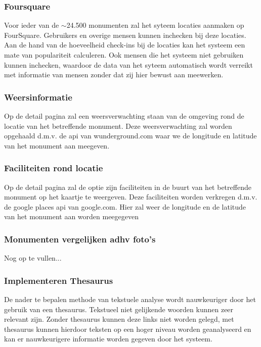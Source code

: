 \documentclass[a4paper,10pt]{article}
\begin{document}
			\subsubsection{Foursquare}
			Voor ieder van de $\sim$24.500 monumenten zal het syteem locaties aanmaken op FourSquare. Gebruikers en overige mensen kunnen inchecken bij deze locaties. Aan de hand van de hoeveelheid check-ins bij de locaties kan het systeem een mate van populariteit calculeren. Ook mensen die het systeem niet gebruiken kunnen inchecken, waardoor de data van het syteem automatisch wordt verreikt met informatie van mensen zonder dat zij hier bewust aan meewerken.
				
			\subsubsection{Weersinformatie}
			Op de detail pagina zal een weersverwachting staan van de omgeving rond de locatie van het betreffende monument. Deze weersverwachting zal worden opgehaald d.m.v. de api van wunderground.com waar we de longitude en latitude van het monument aan meegeven.
				
			\subsubsection{Faciliteiten rond locatie}
			Op de detail pagina zal de optie zijn faciliteiten in de buurt van het betreffende monument op het kaartje te weergeven. Deze faciliteiten worden verkregen d.m.v. de google places api van google.com. Hier zal weer de longitude en de latitude van het monument aan worden meegegeven
				
			\subsubsection{Monumenten vergelijken adhv foto's}
			Nog op te vullen...
				
			\subsubsection{Implementeren Thesaurus}
			De nader te bepalen methode van tekstuele analyse wordt nauwkeuriger door het gebruik van een thesaurus. Tekstueel niet gelijkende woorden kunnen zeer relevant zijn. Zonder thesaurus kunnen deze links niet worden gelegd, met thesaurus kunnen hierdoor teksten op een hoger niveau worden geanalyseerd en kan er nauwkeurigere informatie worden gegeven door het systeem.
		
\end{document}
